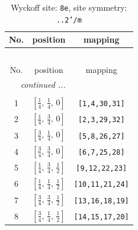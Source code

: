 \documentclass[fleqn,8pt]{jsarticle}
\begin{document}
\begin{longtable}{ccc}
\caption{Wyckoff site: {\tt 8e}, site symmetry: {\tt ..2'/m}}
 \\
 \hline \hline
No. & position & mapping \\ \hline \endfirsthead

\multicolumn{2}{l}{\tablename\ \thetable{}} \\
 \hline \hline
No. & position & mapping \\ \hline \endhead

 \hline \hline
\multicolumn{2}{r}{\footnotesize\it continued ...} \\ \endfoot

 \hline \hline
\multicolumn{2}{r}{} \\ \endlastfoot

1 & $\left[ \frac{1}{4},\, \frac{1}{4},\, 0 \right]$ & {\tt [1,4,30,31]} \\ \hline
2 & $\left[ \frac{1}{4},\, \frac{3}{4},\, 0 \right]$ & {\tt [2,3,29,32]} \\ \hline
3 & $\left[ \frac{3}{4},\, \frac{1}{4},\, 0 \right]$ & {\tt [5,8,26,27]} \\ \hline
4 & $\left[ \frac{3}{4},\, \frac{3}{4},\, 0 \right]$ & {\tt [6,7,25,28]} \\ \hline
5 & $\left[ \frac{1}{4},\, \frac{3}{4},\, \frac{1}{2} \right]$ & {\tt [9,12,22,23]} \\ \hline
6 & $\left[ \frac{1}{4},\, \frac{1}{4},\, \frac{1}{2} \right]$ & {\tt [10,11,21,24]} \\ \hline
7 & $\left[ \frac{3}{4},\, \frac{3}{4},\, \frac{1}{2} \right]$ & {\tt [13,16,18,19]} \\ \hline
8 & $\left[ \frac{3}{4},\, \frac{1}{4},\, \frac{1}{2} \right]$ & {\tt [14,15,17,20]} \\
\end{longtable}
\renewcommand{\arraystretch}{1.2}
\end{document}
